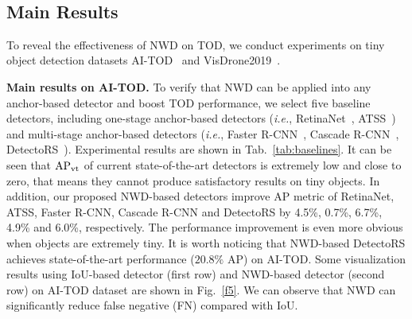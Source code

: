 \documentclass{article}
\newcommand{\fixedvskip}{-3mm}
\newcommand{\ie}{\textit{i.e.}}
\begin{document}
\begin{figure*}[h]
    \centering
    \\ \vspace{-0.2cm}
    \vspace{\fixedvskip}
    \caption{Visualization of detection results using IoU-based detector (first row) and NWD-based detector (second row) of AI-TOD dataset. The green, blue and red boxes denote true positive (TP), false positive (FP) and false negative (FN) predictions, respectively.}
    \label{f5}
    \vspace{\fixedvskip}
\end{figure*}



\subsection{Main Results}

To reveal the effectiveness of NWD on TOD, we conduct experiments on tiny object detection datasets AI-TOD~\cite{AI-TOD_2020_ICPR} and VisDrone2019~\cite{visdrone2019_2019_iccvw}.

\textbf{Main results on AI-TOD.} To verify that NWD can be applied into any anchor-based detector and boost TOD performance, we select five baseline detectors, including one-stage anchor-based detectors (\ie, RetinaNet~\cite{Focal-Loss_2017_ICCV}, ATSS~\cite{atss_2020_cvpr}) and multi-stage anchor-based detectors (\ie, Faster R-CNN~\cite{Faster-R-CNN_2015_NIPS}, Cascade R-CNN~\cite{Cascade-R-CNN_2018_CVPR}, DetectoRS~\cite{DetectoRS_2020_arXiv}). Experimental results are shown in Tab.~\ref{tab:baselines}. It can be seen that $\rm{AP_{vt}}$ of current state-of-the-art detectors is extremely low and close to zero, that means they cannot produce satisfactory results on tiny objects. In addition, our proposed NWD-based detectors improve AP metric of RetinaNet, ATSS, Faster R-CNN, Cascade R-CNN and DetectoRS by 4.5\%, 0.7\%, 6.7\%, 4.9\% and 6.0\%, respectively. The performance improvement is even more obvious when objects are extremely tiny. It is worth noticing that NWD-based DetectoRS achieves state-of-the-art performance ($20.8\%$ AP) on AI-TOD.  Some visualization results using IoU-based detector (first row) and NWD-based detector (second row) on AI-TOD dataset are shown in Fig.~\ref{f5}. We can observe that NWD can significantly reduce false negative (FN) compared with IoU.
\end{document}
